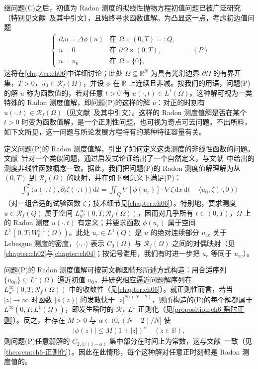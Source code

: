 \documentclass[../main.tex]{subfiles}
\begin{document}
继问题(C)之后，初值为 Radon 测度的拟线性抛物方程初值问题已被广泛研究（特别见文献~\cite{ref16,ref26,ref35,ref36,ref81,ref104}及其中引文），且始终寻求函数值解。为凸显这一点，考虑初边值问题
\begin{align*}
\begin{cases}
\partial_t u = \Delta\phi(u) & \text{在 }\Omega\times(0,T)=:Q,\\
u=0 & \text{在 }\partial\Omega\times(0,T),\\
u=u_0 & \text{在 }\Omega\times\{0\},
\end{cases}
\qquad(P)
\end{align*}
这将在\cref{chapter:ch06}中详细讨论；此处 $\Omega\subseteq\mathbb{R}^N$ 为具有光滑边界 $\partial\Omega$ 的有界开集，$T>0$，$u_0\in\mathscr{R}_f(\Omega)$，并设 $\phi$ 在 $\mathbb{R}$ 上连续且非减。按我们的用语，问题(P)的解 $u$ 称为函数值的，若对任意 $t>0$ 有 $u(\cdot,t)\in L^1(\Omega)$。这种解可视为一类特殊的 Radon 测度值解，即问题(P)的这样的解 $u$：对正的时刻有 $u(\cdot,t)\in\mathscr{R}_f(\Omega)$（见文献~\cite{ref85,ref86,ref87}及其中引文）。这样的 Radon 测度值解是否在某个 $t>0$ 时变为函数值解，是一个正则性问题，也可视为奇点可去问题。不出所料，如下文所见，这一问题与所论发展方程特有的某种特征容量有关。

定义问题(P)的 Radon 测度值解，引出了如何定义这类测度的非线性函数的问题。文献~\cite{ref11}针对一个类似问题，通过启发式论证给出了一个自然定义，与文献~\cite{ref38,ref39}中给出的测度非线性函数概念一致。据此，我们把问题(P)的 Radon 测度值解理解为从 $(0,T)$ 到 $\mathscr{R}_f(\Omega)$ 的映射，并在如下弱意义下满足(P)：
\begin{align*}
\int_0^T \langle u(\cdot,t),\partial_t\zeta(\cdot,t)\rangle\,\mathrm{d}t
= \iint_Q \nabla[\phi(u_r)]\cdot\nabla\zeta\,\mathrm{d}x\,\mathrm{d}t
- \langle u_0,\zeta(\cdot,0)\rangle
\end{align*}
（对一组合适的试验函数 $\zeta$；技术细节见\cref{chapter:ch06}）。特别地，要求测度 $u\in\mathscr{R}_f(Q)$ 属于空间 $L^\infty_{w^*}(0,T;\mathscr{R}_f(\Omega))$，因而对几乎所有 $t\in(0,T)$，$\Omega$ 上的 Radon 测度 $u(\cdot,t)$ 有定义；并要求函数 $\phi(u_r)$ 属于空间 $L^1(0,T;W^{1,1}_0(\Omega))$。此处 $u_r\in L^1(Q)$ 是 $u$ 的绝对连续部分 $u_{\mathrm{ac}}$ 关于 Lebesgue 测度的密度，$\langle\cdot,\cdot\rangle$ 表示 $C_0(\Omega)$ 与 $\mathscr{R}_f(\Omega)$ 之间的对偶映射（见\cref{chapter:ch02}与\cref{chapter:ch04}；按记号滥用，我们有时进一步把 $u_r$ 等同于 $u_{\mathrm{ac}}$）。

问题(P)的 Radon 测度值解可按前文椭圆情形所述方式构造：用合适序列 $\{u_{0n}\}\subseteq L^1(\Omega)$ 逼近初值 $u_0$，并研究相应逼近问题解序列在 $L^\infty_{w^*}(0,T;\mathscr{R}_f(\Omega))$ 中的收敛性（见\cref{chapter:ch06}）。就正则性而言，若当 $|z|\to\infty$ 时函数 $|\phi(z)|$ 的发散快于 $|z|^{N/(N-2)}$，则所构造的(P)的每个解都属于 $L^\infty(0,T;L^1(\Omega))$，即发生瞬时的 $\mathscr{R}_f$--$L^1$ 正则化（见\cref{proposition:ch6-瞬时正则}）。反之，若存在 $M>0$ 与 $\alpha\in(0,(N-2)/N]$ 使
\begin{align*}
|\phi(z)| \leqslant M(1+|z|)^\alpha \quad (z\in\mathbb{R}),
\end{align*}
则问题(P)任意弱解的 $C_{2,1/(1-\alpha)}$ 集中部分在时间上为常数，这与文献~\cite{ref80}一致（见\cref{theorem:ch6-正则化}）。因此在此情形，每个这种解对任意正时刻都是 Radon 测度值的。
\end{document}
